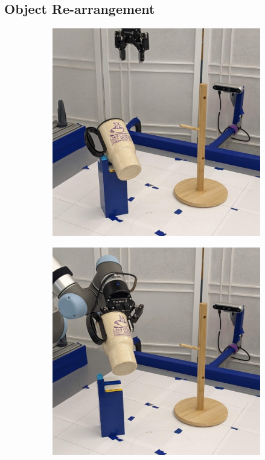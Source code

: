 \documentclass{article}
\begin{document}
\subsection{Object Re-arrangement}
\label{sec:exp:rearrangement}

\begin{figure}[]
    \centering

    \begin{subfigure}{(\linewidth - 0.05\linewidth)/5}
        \centering
        \includegraphics[width=\linewidth]{figures/episodes/mug_on_tree_zoom/1.jpg}
    \end{subfigure}
    \begin{subfigure}{(\linewidth - 0.05\linewidth)/5}
        \centering
        \includegraphics[width=\linewidth]{figures/episodes/mug_on_tree_zoom/6.jpg}

\end{subfigure}
\end{figure}
\end{document}
